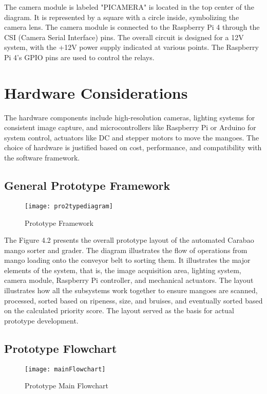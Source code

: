 The camera module is labeled "PICAMERA" is located in the top center of the
diagram. It is represented by a square with a circle inside, symbolizing the
camera lens. The camera module is connected to the Raspberry Pi 4 through the
CSI (Camera Serial Interface) pins. The overall circuit is designed for a 12V
system, with the +12V power supply indicated at various points. The Raspberry Pi
4's GPIO pins are used to control the relays.

\section{Hardware Considerations}
The hardware components include high-resolution cameras, lighting systems for consistent image capture, and 
microcontrollers like Raspberry Pi or Arduino for system control, actuators like DC and stepper motors to move 
the mangoes. The choice of hardware is justified based on cost, performance, and compatibility with the software framework.

\subsection{General Prototype Framework}
\begin{figure}[!htbp]
	\centering
	\texttt{[image: pro2typediagram]}
	\caption{Prototype Framework}
	\label{fig:prototypeDiagram_fig}
\end{figure}

The Figure 4.2 presents the overall prototype layout of the automated Carabao
mango sorter and grader. The diagram illustrates the flow of operations from
mango loading onto the conveyor belt to sorting them. It illustrates the major
elements of the system, that is, the image acquisition area, lighting system,
camera module, Raspberry Pi controller, and mechanical actuators. The layout
illustrates how all the subsystems work together to ensure mangoes are scanned,
processed, sorted based on ripeness, size, and bruises, and eventually sorted
based on the calculated priority score. The layout served as the basis for
actual prototype development.



\subsection{Prototype Flowchart}
\begin{figure}[!htbp]
	\centering
	\texttt{[image: mainFlowchart]}
	\caption{Prototype Main Flowchart}
	\label{fig:pro2typeDiagram_fig}
\end{figure}

